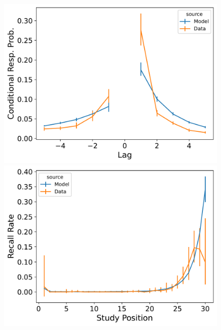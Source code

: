 \documentclass[
  letterpaper,
  11pt,
  english,
  singlespacing,
  headsepline]{MastersDoctoralThesis}
\begin{document}
\begin{figure}

\begin{minipage}{0.33\linewidth}
\includegraphics{icmr_figures/Murdock1962_ConnectionistCMR_Model_Fitting_LL30_crp-1.png}\end{minipage}%
%
\begin{minipage}{0.33\linewidth}
\includegraphics{icmr_figures/Murdock1962_ConnectionistCMR_Model_Fitting_LL30_pnr-1.png}\end{minipage}%
%
\begin{minipage}{0.33\linewidth}

\end{minipage}
\end{figure}
\end{document}
